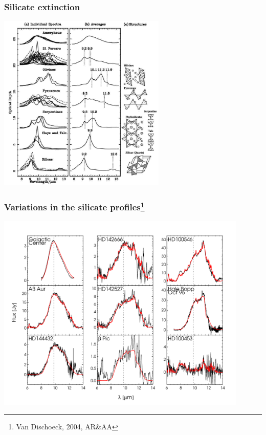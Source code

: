 \begin{frame}\frametitle{Silicate extinction}
 


\begin{center}
      \includegraphics[width=0.6\textwidth,height=!]{./D/cristsil_bowey.jpg}
\end{center}


\end{frame}
\begin{frame}\frametitle{Variations in the silicate profiles\footnote{Van Dischoeck, 2004, AR\&AA}}

\begin{center}
      \includegraphics[width=0.9\textwidth,height=!]{./D/dishoeck_fig12.pdf}
\end{center}

\end{frame}
